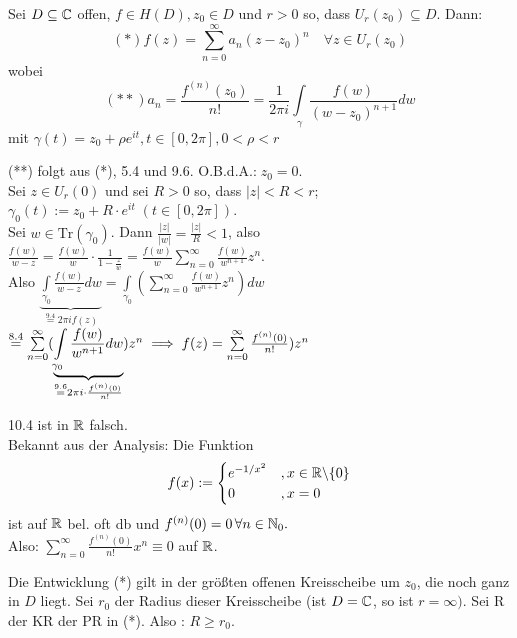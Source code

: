 \documentclass[a4paper,twoside,DIV15,BCOR12mm]{scrbook}
\def\Tr{\text{Tr}}
\def\wegint{\ensuremath{\int\limits_\gamma}}
\begin{document}
\begin{satz}[Potenzreihenentwicklung]
Sei $D \subseteq \mathbb{C}$ offen, $f \in H(D), z_0 \in D$ und $r > 0$ so, dass $U_r(z_0) \subseteq D$. Dann:
$$(*)f(z) = \sum _{n=0}^{\infty}a_n(z-z_0)^n \quad \forall z \in U_r(z_0)$$
wobei
$$(**) a_n = \frac{f^{(n)}(z_0)}{n!} = \frac{1}{2\pi i}\wegint\frac{f(w)}{(w-z_0)^{n+1}}dw$$
mit $\gamma (t) = z_0 + \rho e^{it}, t \in [0,2\pi], 0<\rho <r$
\end{satz}

\begin{beweis}
(**) folgt aus (*), 5.4 und 9.6. O.B.d.A.:$\;z_0 = 0$. \\
Sei $z \in U_r(0)$ und sei $R>0$ so, dass $|z|<R<r$;\\
$\gamma _0(t) := z_0 + R\cdot e^{it} \;(t \in [0,2\pi])$. \\
Sei $w \in \Tr (\gamma _0)$. Dann $\frac{|z|}{|w|} = \frac{|z|}{R} < 1$, also $\frac{f(w)}{w-z} = \frac{f(w)}{w}\cdot \frac{1}{1-\frac{z}{w}} = \frac{f(w)}{w}\sum\limits _{n=0}^{\infty}\frac{f(w)}{w^{n+1}}z^n$.\\
Also $\underbrace{\int\limits _{\gamma _0} \frac{f(w)}{w-z} dw}_{\stackrel{9.4}{=}2\pi if(z)} = \int\limits _{\gamma _0}(\sum\limits _{n=0}^{\infty}\frac{f(w)}{w^{n+1}}z^n)dw $\\
$\stackrel{8.4}{=}\sum\limits _{n=0}^{\infty}(\underbrace{\int\limits _{\gamma _0}\frac{f(w)}{w^{n+1}}dw}_{\stackrel{9.6}{=}2\pi i\cdot\frac{f^{(n)}(0)}{n!}})z^n \implies f(z) = \sum\limits _{n=0}^{\infty}\frac{f^{(n)}(0)}{n!})z^n$
\end{beweis} 

\begin{bemerkungen}
\item 10.4 ist in $\mathbb{R}$ falsch. \\Bekannt aus der Analysis: Die Funktion
$$f(x) := \begin{cases}e^{-1/x^2} &, x\in\mathbb{R}\backslash\{0\} \\ 0 &, x=0\end{cases}$$ ist auf $\mathbb{R}$ bel. oft db und $f^{(n)}(0) = 0 \,\forall n \in \mathbb{N} _0.$ \\
Also: $\sum\limits _{n=0}^{\infty}\frac{f^{(n)}(0)}{n!}x^n \equiv 0$ auf $\mathbb{R}$.
\item Die Entwicklung (*) gilt in der größten offenen Kreisscheibe um $z_0$, die noch ganz in $D$ liegt. Sei $r_0$ der Radius dieser Kreisscheibe (ist $D = \mathbb{C}$, so ist $r = \infty)$. Sei R der KR der PR in (*). Also : $R \geq r_0$.
\end{bemerkungen}
\end{document}
